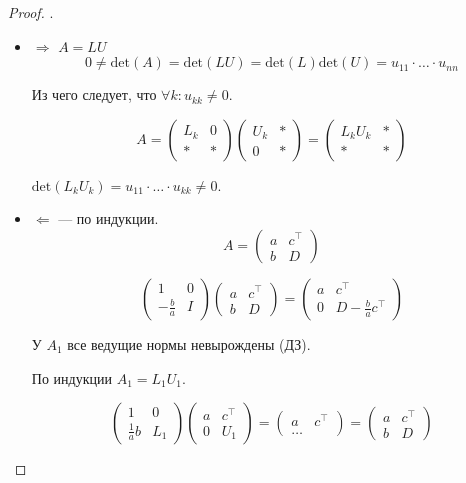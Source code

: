 \begin{proof} .
    \begin{itemize}
        \item $\Rightarrow$ $A = LU$
            \[
                0 \ne \textrm{det}(A) = \textrm{det}(L U) = \textrm{det}(L)
                \textrm{det}(U) = u_{11} \cdot \ldots \cdot u_{nn}
            \]

            Из чего следует, что $\forall k: u_{k k} \ne 0$.

            \[
                A = \begin{pmatrix} L_k & 0 \\ * & * \end{pmatrix}
                \begin{pmatrix} U_k & * \\ 0 & * \end{pmatrix}
                = \begin{pmatrix} L_k U_k & * \\ * & * \end{pmatrix}
            \]

            $\textrm{det}(L_k U_k) = u_{11} \cdot \ldots \cdot u_{kk} \ne 0$.

        \item $\Leftarrow$ --- по индукции.
            \[
                A = \begin{pmatrix} a & c^\top \\ b & D \end{pmatrix}
            \]

            \[
                \begin{pmatrix} 1 & 0 \\ -\frac{b}{a} & I \end{pmatrix}
                \begin{pmatrix} a & c^\top \\ b & D \end{pmatrix}
                = \begin{pmatrix} a & c^\top \\ 0 & D - \frac{b}{a} c^\top
                \end{pmatrix}
            \]

            У $A_1$ все ведущие нормы невырождены (ДЗ).

            По индукции $A_1 = L_1 U_1$.

            \[
                \begin{pmatrix} 1 & 0 \\ \frac{1}{a} b & L_1 \end{pmatrix}
                \begin{pmatrix} a & c^\top \\ 0 & U_1 \end{pmatrix}
                = \begin{pmatrix} a & c^\top \\ \dots \end{pmatrix}
                = \begin{pmatrix} a & c^\top \\ b & D \end{pmatrix}
            \]
    \end{itemize}
\end{proof}

